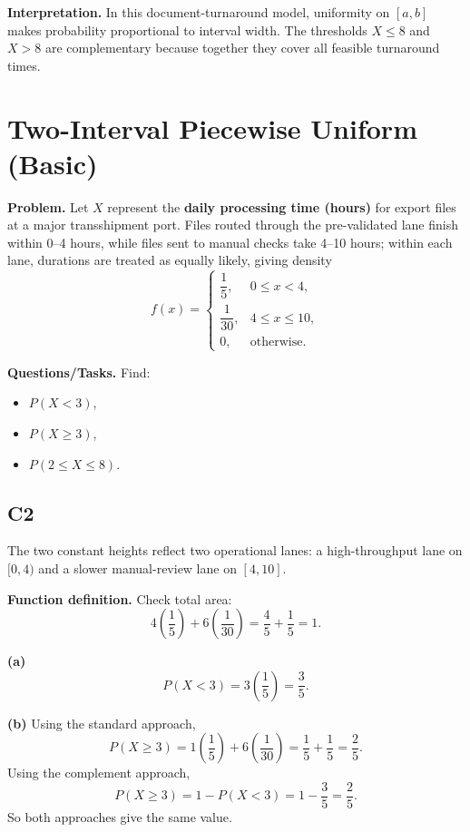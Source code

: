 \textbf{Interpretation.}
In this document-turnaround model, uniformity on $[a,b]$ makes probability proportional to interval width. The thresholds $X\le 8$ and $X>8$ are complementary because together they cover all feasible turnaround times.

\section{Two-Interval Piecewise Uniform (Basic)}

\textbf{Problem.}
Let $X$ represent the \textbf{daily processing time (hours)} for export files at a major transshipment port. Files routed through the pre-validated lane finish within 0--4 hours, while files sent to manual checks take 4--10 hours; within each lane, durations are treated as equally likely, giving density
\[
f(x)=
\begin{cases}
	\dfrac{1}{5}, & 0\le x<4,\\
	\dfrac{1}{30}, & 4\le x\le 10,\\
	0, & \text{otherwise.}
\end{cases}
\]

\textbf{Questions/Tasks.}
Find:
\begin{itemize}
	\item[(a)] $P(X<3)$,
	\item[(b)] $P(X\ge 3)$,
	\item[(c)] $P(2\le X\le 8)$.
\end{itemize}

\subsection*{C2}

The two constant heights reflect two operational lanes: a high-throughput lane on $[0,4)$ and a slower manual-review lane on $[4,10]$.

\textbf{Function definition.}
Check total area:
\[
4\left(\frac{1}{5}\right)+6\left(\frac{1}{30}\right)=\frac{4}{5}+\frac{1}{5}=1.
\]


\textbf{(a)}
\[
P(X<3)=3\left(\frac{1}{5}\right)=\frac{3}{5}.
\]


\textbf{(b)} Using the standard approach,
\[
P(X\ge 3)=1\left(\frac{1}{5}\right)+6\left(\frac{1}{30}\right)=\frac{1}{5}+\frac{1}{5}=\frac{2}{5}.
\]
Using the complement approach,
\[
P(X\ge 3)=1-P(X<3)=1-\frac{3}{5}=\frac{2}{5}.
\]
So both approaches give the same value.

